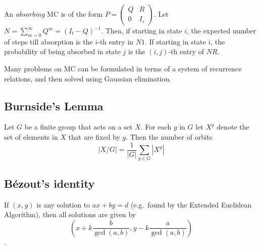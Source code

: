 \documentclass[9pt,a4paper,twocolumn,landscape,oneside]{amsart}
\begin{document}
        An \textit{absorbing} MC is of the form $P = \left(\begin{matrix} Q & R
        \\ 0 & I_r \end{matrix}\right)$. Let $N = \sum_{m=0}^\infty Q^m = (I_t
        - Q)^{-1}$. Then, if starting in state $i$, the expected number of
        steps till absorption is the $i$-th entry in $N1$. If starting in state
        $i$, the probability of being absorbed in state $j$ is the $(i,j)$-th
        entry of $NR$.

        Many problems on MC can be formulated in terms of a system of
        recurrence relations, and then solved using Gaussian elimination.

    \subsection{Burnside's Lemma}
        Let $G$ be a finite group that acts on a set $X$. For each $g$ in $G$
        let $X^g$ denote the set of elements in $X$ that are fixed by $g$. Then
        the number of orbits \[ |X/G| = \frac{1}{|G|} \sum_{g\in G} |X^g| \]

    \subsection{Bézout's identity}
        If $(x,y)$ is any solution to $ax+by=d$ (e.g.\ found by the Extended
        Euclidean Algorithm), then all solutions are given by \[
        \left(x+k\frac{b}{\gcd(a,b)}, y-k\frac{a}{\gcd(a,b)}\right) \].
\end{document}
